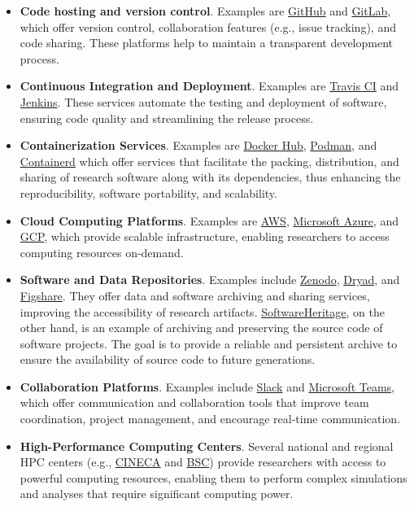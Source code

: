 \begin{itemize}
    \item \textbf{Code hosting and version control}. Examples are \href{https://github.com}{GitHub} and \href{https://about.gitlab.com/}{GitLab}, which offer version control, collaboration features (e.g., issue tracking), and code sharing. These platforms help to maintain a transparent development process.
    \item \textbf{Continuous Integration and Deployment}. Examples are \href{https://www.travis-ci.com/}{Travis CI} and \href{https://jenkins.io}{Jenkins}. These services automate the testing and deployment of software, ensuring code quality and streamlining the release process.
    \item \textbf{Containerization Services}. Examples are \href{https://hub.docker.com/}{Docker Hub}, \href{https://podman.io}{Podman}, and \href{https://containerd.io}{Containerd} which offer services that facilitate the packing, distribution, and sharing of research software along with its dependencies, thus enhancing the reproducibility, software portability, and scalability.
    \item \textbf{Cloud Computing Platforms}. Examples are \href{https://aws.amazon.com/}{AWS}, \href{https://azure.microsoft.com/}{Microsoft Azure}, and \href{https://cloud.google.com/}{GCP}, which provide scalable infrastructure, enabling researchers to access computing resources on-demand.
    \item \textbf{Software and Data Repositories}. Examples include \href{https://zenodo.org/}{Zenodo}, \href{https://datadryad.org/}{Dryad}, and \href{https://figshare.com/}{Figshare}. They offer data and software archiving and sharing services, improving the accessibility of research artifacts. \href{https://www.softwareheritage.org/}{SoftwareHeritage}, on the other hand, is an example of archiving and preserving the source code of software projects. The goal is to provide a reliable and persistent archive to ensure the availability of source code to future generations.
    \item \textbf{Collaboration Platforms}. Examples include \href{https://slack.com}{Slack} and \href{https://www.microsoft.com/en-us/microsoft-teams/group-chat-software}{Microsoft Teams}, which offer communication and collaboration tools that improve team coordination, project management, and encourage real-time communication.
    \item \textbf{High-Performance Computing Centers}. Several national and regional HPC centers (e.g., \href{https://www.cineca.it/en}{CINECA} and \href{https://www.bsc.es/}{BSC}) provide researchers with access to powerful computing resources, enabling them to perform complex simulations and analyses that require significant computing power.
\end{itemize}

